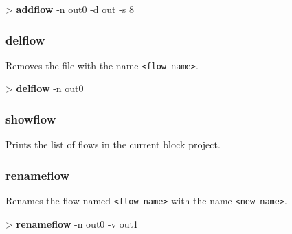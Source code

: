\documentclass[10pt,a4paper]{article}
\begin{document}
\begin{sampletitle}
> \textbf{\tool{} addflow} -n out0 -d out -s 8
\end{sampletitle}


\subsubsection{delflow}
\label{subsec:delflow}

Removes the file with the name \texttt{<flow-name>}.\\


\begin{sampletitle}
> \textbf{\tool{} delflow} -n out0
\end{sampletitle}


\subsubsection{showflow}
\label{subsec:showflow}

Prints the list of flows in the current block project.

\subsubsection{renameflow}
\label{subsec:renameflow}

Renames the flow named \texttt{<flow-name>} with the name \texttt{<new-name>}.\\


\begin{sampletitle}
> \textbf{\tool{} renameflow} -n out0 -v out1
\end{sampletitle}
\end{document}
